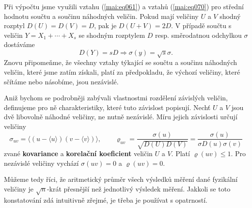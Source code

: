       Při výpočtu jsme využili vztahu (\ref{mai:eq061}) a vztahů (\ref{mai:eq070}) pro střední 
      hodnotu součtu a součinu náhodných veličin. Pokud mají veličiny \(U\) a \(V\) shodný rozptyl 
      \(D(U) = D(V) = D\), pak je \(D(U + V) = 2D\). V případě součtu s veličin \(Y = X_1 + \cdots 
      + X_s\) se shodným rozptylem \(D\) resp. směrodatnou odchylkou \(\sigma\) dostáváme
      \begin{equation*}
        D(Y) = sD  \Rightarrow \sigma(y) = \sqrt{s}\sigma.
      \end{equation*}
      Znovu připomeňme, že všechny vztahy týkající se součtu a součinu náhodných veličin, které
      jsme zatím získali, platí za předpokladu, že výchozí veličiny, které sčítáme nebo násobíme, 
      jsou nezávislé.
      
      Aniž bychom se podrobněji zabývali vlastnostmi rozdělení závislých veličin, definujeme pro
      ně charakteristiky, které tuto závislost popisují. Nechť \(U\) a \(V\) jsou dvě libovolně 
      náhodné veličiny, ne nutně nezávislé. Míru jejich závislosti určují veličiny
      \begin{equation}\label{mai:eq071}
        \sigma_{uv} = \langle (u - \langle u \rangle) (v - \langle v \rangle) \rangle, \qquad
        \varrho_ {uv}=\dfrac{\sigma(u)}{\sqrt{D(U)D(V)}} = \dfrac{\sigma(u)}{\sigma{D(u)\sigma(v)}}
      \end{equation}
      zvané \textbf{kovariance} a \textbf{korelační koeficient} veličin \(U\) a \(V\). Platí 
      \(\varrho(uv) \leq 1\). Pro nezávislé veličiny vychází \(\sigma(uv) = 0\) a \(\varrho(uv) = 
      0\).
      
      
      
      
      
      Můžeme tedy říci, že aritmetický průměr všech výsledků měření dané fyzikální veličiny je
      \(\sqrt{n}\)-krát přesnější než jednotlivý výsledek měření. Jakkoli se toto konstatování zdá 
      intuitivně zřejmé, je třeba je používat s opatrností.
      
